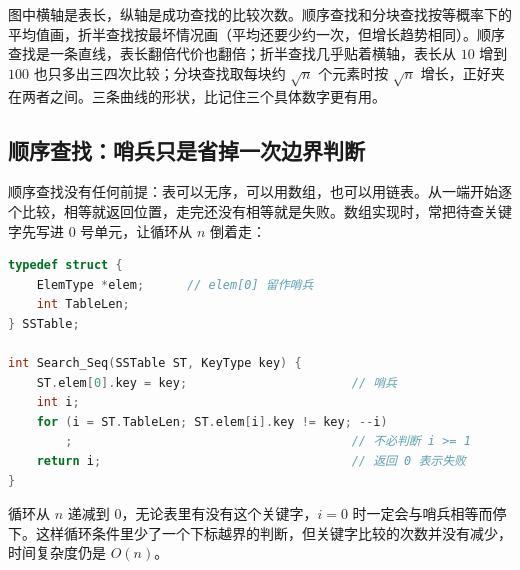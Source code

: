 {\small\color{MutedText} 图中横轴是表长，纵轴是成功查找的比较次数。顺序查找和分块查找按等概率下的平均值画，折半查找按最坏情况画（平均还要少约一次，但增长趋势相同）。顺序查找是一条直线，表长翻倍代价也翻倍；折半查找几乎贴着横轴，表长从 $10$ 增到 $100$ 也只多出三四次比较；分块查找取每块约 $\sqrt n$ 个元素时按 $\sqrt n$ 增长，正好夹在两者之间。三条曲线的形状，比记住三个具体数字更有用。}

\subsection{顺序查找：哨兵只是省掉一次边界判断}

顺序查找没有任何前提：表可以无序，可以用数组，也可以用链表。从一端开始逐个比较，相等就返回位置，走完还没有相等就是失败。数组实现时，常把待查关键字先写进 $0$ 号单元，让循环从 $n$ 倒着走：

\begin{lstlisting}[language=C]
typedef struct {
    ElemType *elem;      // elem[0] 留作哨兵
    int TableLen;
} SSTable;

int Search_Seq(SSTable ST, KeyType key) {
    ST.elem[0].key = key;                       // 哨兵
    int i;
    for (i = ST.TableLen; ST.elem[i].key != key; --i)
        ;                                       // 不必判断 i >= 1
    return i;                                   // 返回 0 表示失败
}
\end{lstlisting}

循环从 $n$ 递减到 $0$，无论表里有没有这个关键字，$i=0$ 时一定会与哨兵相等而停下。这样循环条件里少了一个下标越界的判断，但关键字比较的次数并没有减少，时间复杂度仍是 $O(n)$。

\begin{center}
\end{center}

